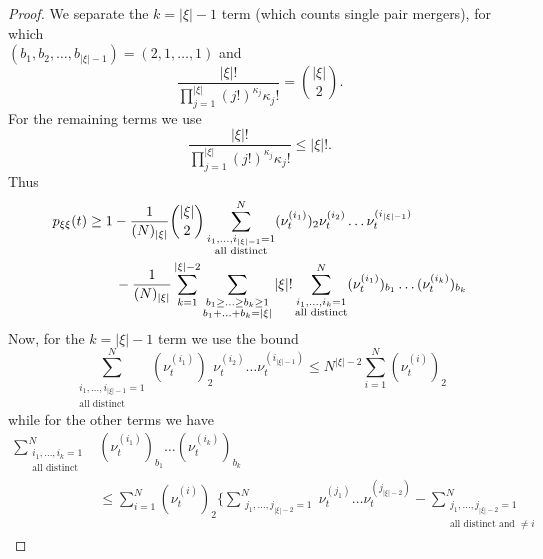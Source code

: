 \begin{proof}
We separate the $k=|\xi|-1$ term (which counts single pair mergers), for which\\ $(b_1, b_2, \dots, b_{|\xi|-1}) = (2,1,\dots,1)$ and
\begin{equation*}
\frac{ | \xi |! }{ \prod_{ j = 1 }^{ | \xi | } ( j ! )^{ \kappa_j } \kappa_j ! }
= \binom{|\xi|}{2} .
\end{equation*}
For the remaining terms we use
\begin{equation*}
\frac{ | \xi |! }{ \prod_{ j = 1 }^{ | \xi | } ( j ! )^{ \kappa_j } \kappa_j ! }
\leq |\xi|! .
\end{equation*}
Thus
\begin{align}
p_{ \xi \xi }( t ) 
&\geq 1 - \frac{ 1 }{ ( N )_{ | \xi | } } \binom{|\xi|}{2}
        \sum_{ \substack{ i_1, \ldots, i_{|\xi|-1} = 1 \\ \text{all distinct} } }^N 
        ( \nu_t^{ ( i_1 ) } )_2 \nu_t^{(i_2)} \ldots \nu_t^{ ( i_{|\xi|-1} ) } \notag\\
    &\qquad- \frac{ 1 }{ ( N )_{ | \xi | } } \sum_{ k = 1 }^{ | \xi | - 2 } 
        \sum_{ \substack{ b_1 \geq \ldots \geq b_k \geq 1 
        \\ b_1 + \ldots + b_k = | \xi | } } |\xi|!
        \sum_{ \substack{ i_1, \ldots, i_k = 1 \\ \text{all distinct} } }^N 
        ( \nu_t^{ ( i_1 ) } )_{ b_1 } \ldots ( \nu_t^{ ( i_k ) } )_{ b_k } \label{eq:pDeltaLB_1}
\end{align}
Now, for the $k=|\xi|-1$ term we use the bound
\begin{equation*}
\sum_{\substack{ i_1, \ldots, i_{ | \xi | - 1 } = 1 \\ \text{all distinct} }}^N 
        ( \nu_t^{ ( i_1 ) } )_2 \nu_t^{ ( i_2 ) } \ldots \nu_t^{ ( i_{ | \xi | - 1 } ) }
\leq N^{ | \xi | - 2 } \sum_{ i = 1 }^N ( \nu_t^{ ( i ) } )_2
\end{equation*}
while for the other terms we have \parencite[similarly to][Lemma 1 Case 3]{koskela2018}
\begin{align*}
\sum_{ \substack{ i_1, \ldots, i_k = 1 \\ \text{all distinct} } }^N 
        &( \nu_t^{ ( i_1 ) } )_{ b_1 } \ldots ( \nu_t^{ ( i_k ) } )_{ b_k } \\
&\leq \sum_{ i = 1 }^N ( \nu_t^{ ( i ) } )_2 
        \Bigg\{ \sum_{\substack{ j_1, \ldots, j_{ | \xi | - 2 } = 1 }}^N
        \nu_t^{ ( j_1 ) } \ldots \nu_t^{ ( j_{ | \xi | - 2 } ) }
        - \sum_{ \substack{ j_1, \ldots, j_{ | \xi | - 2 } = 1 
        \\ \text{all distinct and } \neq i } }^N 

\end{align*}
\end{proof}
